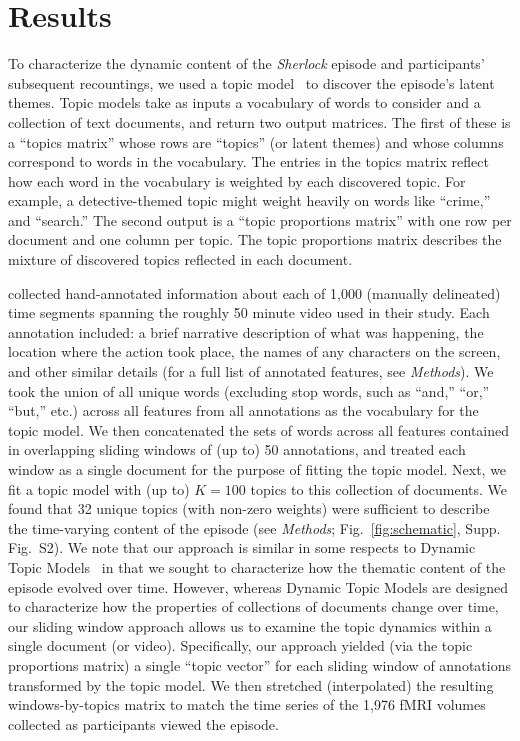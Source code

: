 \documentclass[10pt]{article}
\newcommand{\topics}{S2}
\begin{document}
\section*{Results}
To characterize the dynamic content of the \textit{Sherlock} episode and participants' subsequent recountings, we used a topic model~\citep{BleiEtal03} to discover the episode's latent themes.  Topic models take as inputs a vocabulary of words to consider and a collection of text documents, and return two output matrices.  The first of these is a ``topics matrix'' whose rows are ``topics'' (or latent themes) and whose columns correspond to words in the vocabulary. The entries in the topics matrix reflect how each word in the vocabulary is weighted by each discovered topic.  For example, a detective-themed topic might weight heavily on words like ``crime,'' and ``search.''  The second output is a ``topic proportions matrix'' with one row per document and one column per topic.  The topic proportions matrix describes the mixture of discovered topics reflected in each document.

\cite{ChenEtal17} collected hand-annotated information about each of 1,000 (manually delineated) time segments spanning the roughly 50 minute video used in their study.  Each annotation included: a brief narrative description of what was happening, the location where the action took place, the names of any characters on the screen, and other similar details (for a full list of annotated features, see \textit{Methods}).  We took the union of all unique words (excluding stop words, such as ``and,'' ``or,'' ``but,'' etc.) across all features from all annotations as the vocabulary for the topic model.  We then concatenated the sets of words across all features contained in overlapping sliding windows of (up to) 50 annotations, and treated each window as a single document for the purpose of fitting the topic model.  Next, we fit a topic model with (up to) $K = 100$ topics to this collection of documents.  We found that 32 unique topics (with non-zero weights) were sufficient to describe the time-varying content of the episode (see \textit{Methods}; Fig.~\ref{fig:schematic}, Supp. Fig.~\topics).  We note that our approach is similar in some respects to Dynamic Topic Models~\citep{BleiLaff06} in that we sought to characterize how the thematic content of the episode evolved over time.  However, whereas Dynamic Topic Models are designed to characterize how the properties of collections of documents change over time, our sliding window approach allows us to examine the topic dynamics within a single document (or video).  Specifically, our approach yielded (via the topic proportions matrix) a single ``topic vector'' for each sliding window of annotations transformed by the topic model.  We then stretched (interpolated) the resulting windows-by-topics matrix to match the time series of the 1,976 fMRI volumes collected as participants viewed the episode.
\end{document}

